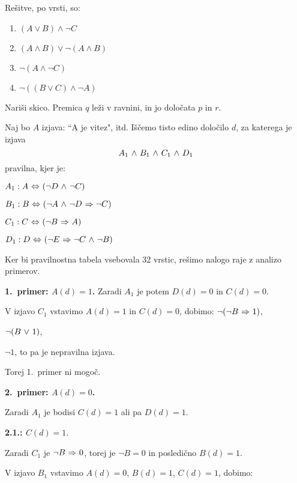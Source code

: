\begin{answer}{1.2}
Rešitve, po vrsti, so:
    \begin{enumerate}
        \item $(A \lor B) \land \neg C$
        \item $(A \land B) \lor \neg (A \land B)$
        \item $\neg (A \land \neg C)$
        \item $\neg ((B \lor C) \land \neg A)$
    \end{enumerate}
\end{answer}
\begin{answer}{1.4}
 Nariši skico. Premica $q$ leži v ravnini, in jo določata $p$ in $r$.
\end{answer}
\begin{answer}{1.8}
Naj bo $A$ izjava: ``A je vitez", itd.
Iščemo tisto edino določilo $d$, za katerega je izjava $$A_1{~\wedge~} B_1{~\wedge~} C_1{~\wedge~} D_1$$
pravilna, kjer je:

$A_1: A{~\Leftrightarrow~} (\neg D {~\wedge~} \neg C)$

$B_1: B{~\Leftrightarrow~} (\neg A {~\wedge~} \neg D{~\Rightarrow~} \neg C)$

$C_1: C{~\Leftrightarrow~} (\neg B {~\Rightarrow~} A)$

$D_1: D{~\Leftrightarrow~} (\neg E {~\Rightarrow~} \neg C {~\wedge~} \neg B)$


Ker bi pravilnostna tabela vsebovala 32 vrstic, rešimo nalogo
raje z analizo primerov.

\textbf{1.~primer: $A(d) = 1$.}
Zaradi $A_1$ je potem $D(d) = 0$ in $C(d) = 0$.

V izjavo $C_1$ vstavimo $A(d) = 1$ in $C(d) = 0$, dobimo:
$\neg(\neg B{~\Rightarrow~} 1)$,

$\neg(B{~\vee~} 1)$,

$\neg 1$, to pa je nepravilna izjava.

Torej 1.~primer ni mogoč.
%
%
%
%
%
%

\textbf{2.~primer: $A(d) = 0$.}

Zaradi $A_1$ je bodisi $C(d) = 1$ ali pa $D(d) = 1$.

\textbf{2.1.: $C(d) = 1$}.

Zaradi $C_1$ je $\neg B {~\Rightarrow~} 0$, torej je $\neg B = 0$ in posledično $B(d) = 1$.

V izjavo $B_1$ vstavimo $A(d) = 0$, $B(d) = 1$, $C(d) = 1$, dobimo:


\end{answer}
